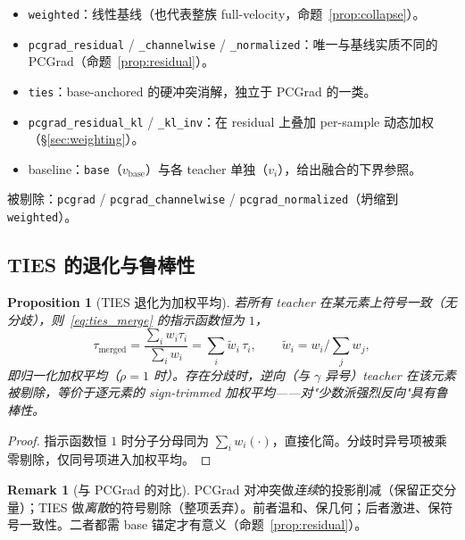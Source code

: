 \documentclass[11pt,a4paper]{article}
\newcommand{\vb}{v_{\mathrm{base}}}
\theoremstyle{plain}
\newtheorem{proposition}{Proposition}
\theoremstyle{definition}
\newtheorem{remark}{Remark}
\begin{document}
\begin{tcolorbox}[colback=gray!6,colframe=gray!50,title=\textbf{为何默认对比是这一组}]
\begin{itemize}[leftmargin=1.4em]
\item \texttt{weighted}：线性基线（也代表整族 full-velocity，命题~\ref{prop:collapse}）。
\item \texttt{pcgrad\_residual} / \texttt{\_channelwise} / \texttt{\_normalized}：唯一与基线实质不同的 PCGrad（命题~\ref{prop:residual}）。
\item \texttt{ties}：base-anchored 的硬冲突消解，独立于 PCGrad 的一类。
\item \texttt{pcgrad\_residual\_kl} / \texttt{\_kl\_inv}：在 residual 上叠加 per-sample 动态加权（\S\ref{sec:weighting}）。
\item baseline：\texttt{base}（$\vb$）与各 teacher 单独（$v_i$），给出融合的下界参照。
\end{itemize}
被剔除：\texttt{pcgrad} / \texttt{pcgrad\_channelwise} / \texttt{pcgrad\_normalized}（坍缩到 \texttt{weighted}）。
\end{tcolorbox}

\subsection{TIES 的退化与鲁棒性}

\begin{proposition}[TIES 退化为加权平均]
\label{prop:ties}
若所有 teacher 在某元素上符号一致（无分歧），则~\eqref{eq:ties_merge} 的指示函数恒为 $1$，
\[
\tau_{\mathrm{merged}}=\frac{\sum_i w_i\tau_i}{\sum_i w_i}=\sum_i \tilde w_i\,\tau_i,\qquad \tilde w_i=w_i/\textstyle\sum_j w_j,
\]
即归一化加权平均（$\rho=1$ 时）。存在分歧时，逆向（与 $\gamma$ 异号）teacher 在该元素被剔除，等价于逐元素的 sign-trimmed 加权平均——对"少数派强烈反向"具有鲁棒性。
\end{proposition}
\begin{proof}
指示函数恒 $1$ 时分子分母同为 $\sum_i w_i(\cdot)$，直接化简。分歧时异号项被乘零剔除，仅同号项进入加权平均。
\end{proof}

\begin{remark}[与 PCGrad 的对比]
PCGrad 对冲突做\emph{连续}的投影削减（保留正交分量）；TIES 做\emph{离散}的符号剔除（整项丢弃）。前者温和、保几何；后者激进、保符号一致性。二者都需 base 锚定才有意义（命题~\ref{prop:residual}）。
\end{remark}

\end{document}
